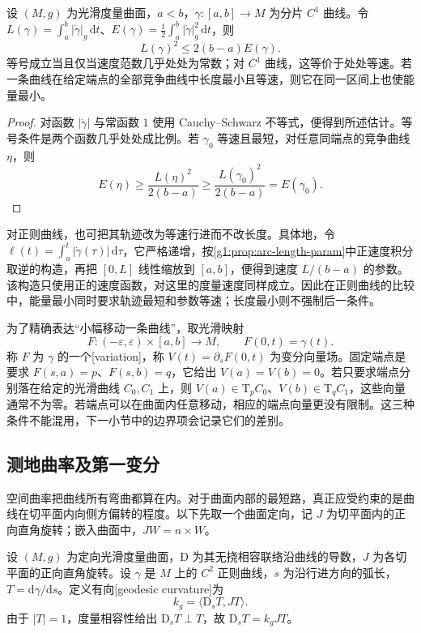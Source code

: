 \begin{proposition}
	\label{g1:prop:length-energy}
	设 \((M,g)\) 为光滑度量曲面，\(a<b\)，\(\gamma:[a,b]\to M\) 为分片 \(C^1\) 曲线。令 \(L(\gamma)=\int_a^b|\dot\gamma|_g\,\mathrm dt\)、\(E(\gamma)=\tfrac12\int_a^b|\dot\gamma|_g^2\,\mathrm dt\)，则
	\[
		L(\gamma)^2\le2(b-a)E(\gamma).
	\]
	等号成立当且仅当速度范数几乎处处为常数；对 \(C^1\) 曲线，这等价于处处等速。若一条曲线在给定端点的全部竞争曲线中长度最小且等速，则它在同一区间上也使能量最小。
\end{proposition}
\begin{proof}
	对函数 \(|\dot\gamma|\) 与常函数 \(1\) 使用 Cauchy--Schwarz 不等式，便得到所述估计。等号条件是两个函数几乎处处成比例。若 \(\gamma_0\) 等速且最短，对任意同端点的竞争曲线 \(\eta\)，则
	\[
		E(\eta)\ge\frac{L(\eta)^2}{2(b-a)}\ge\frac{L(\gamma_0)^2}{2(b-a)}=E(\gamma_0).
	\]
\end{proof}

对正则曲线，也可把其轨迹改为等速行进而不改长度。具体地，令 \(\ell(t)=\int_a^t|\dot\gamma(\tau)|\,\mathrm{d}\tau\)，它严格递增，按\cref{g1:prop:arc-length-param}中正速度积分取逆的构造，再把 \([0,L]\) 线性缩放到 \([a,b]\)，便得到速度 \(L/(b-a)\) 的参数。该构造只使用正的速度函数，对这里的度量速度同样成立。因此在正则曲线的比较中，能量最小同时要求轨迹最短和参数等速；长度最小则不强制后一条件。

\ProseParagraphBreak

为了精确表达“小幅移动一条曲线”，取光滑映射
\[
	F:(-\varepsilon,\varepsilon)\times[a,b]\to M,\qquad F(0,t)=\gamma(t).
\]
称 \(F\) 为 \(\gamma\) 的一个[variation]，称 \(V(t)=\partial_sF(0,t)\) 为变分向量场。固定端点是要求 \(F(s,a)=p\)、\(F(s,b)=q\)，它给出 \(V(a)=V(b)=0\)。若只要求端点分别落在给定的光滑曲线 \(C_0,C_1\) 上，则 \(V(a)\in \mathrm{T}_pC_0\)、\(V(b)\in \mathrm{T}_qC_1\)，这些向量通常不为零。若端点可以在曲面内任意移动，相应的端点向量更没有限制。这三种条件不能混用，下一小节中的边界项会记录它们的差别。

\subsection{测地曲率及第一变分}
\label{g1:subsec:0902:03}

空间曲率把曲线所有弯曲都算在内。对于曲面内部的最短路，真正应受约束的是曲线在切平面内向侧方偏转的程度。以下先取一个曲面定向，记 \(J\) 为切平面内的正向直角旋转；嵌入曲面中，\(JW=n\times W\)。

\begin{definition}
	\label{g1:def:geodesic-curvature}
	设 \((M,g)\) 为定向光滑度量曲面，\(\mathrm D\) 为其无挠相容联络沿曲线的导数，\(J\) 为各切平面的正向直角旋转。设 \(\gamma\) 是 \(M\) 上的 \(C^2\) 正则曲线，\(s\) 为沿行进方向的弧长，\(T=\mathrm{d}\gamma/\mathrm{d}s\)。定义有向[geodesic curvature]为
	\[
		k_g=\langle \mathrm{D}_sT,JT\rangle.
	\]
	由于 \(|T|=1\)，度量相容性给出 \(\mathrm{D}_sT\perp T\)，故 \(\mathrm{D}_sT=k_gJT\)。
\end{definition}

